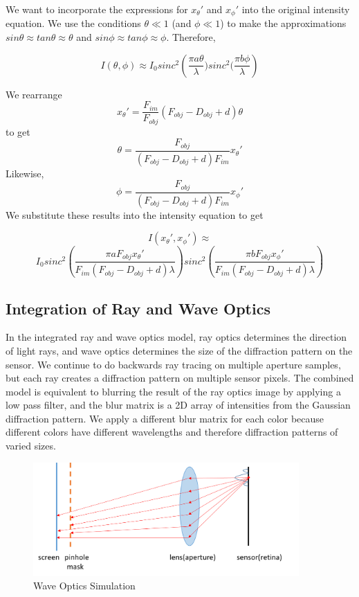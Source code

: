 We want to incorporate the expressions for $x_{\theta}'$ and $x_{\phi}'$ into the original intensity equation. We use the conditions $\theta \ll 1$ (and $\phi \ll 1$) to make the approximations $sin\theta \approx tan\theta \approx \theta$ and $sin\phi \approx tan\phi \approx \phi$. Therefore, 

$$I(\theta, \phi) \approx I_0 sinc^2\left(\frac{\pi a \theta}{\lambda}) sinc^2(\frac{\pi b \phi}{\lambda}\right)$$

We rearrange $$x_{\theta}' = \frac{F_{im}}{F_{obj}} (F_{obj} - D_{obj} + d) \theta $$ to get $$\theta =  \frac{F_{obj}} {(F_{obj} - D_{obj} + d)F_{im}} x_{\theta}'$$ Likewise,  $$\phi =  \frac{F_{obj}} {(F_{obj} - D_{obj} + d)F_{im}} x_{\phi}'$$ We substitute these results into the intensity equation to get

$$I(x_{\theta}', x_{\phi}') \approx $$ $$I_0 sinc^2 \left(\frac{\pi a F_{obj} x_{\theta}'}{F_{im}(F_{obj} - D_{obj} + d)\lambda}\right) sinc^2 \left(\frac{\pi b F_{obj} x_{\phi}'}{F_{im}(F_{obj} - D_{obj} + d)\lambda}\right)$$

\subsection{Integration of Ray and Wave Optics}

In the integrated ray and wave optics model, ray optics determines the direction of light rays, and wave optics determines the size of the diffraction pattern on the sensor. We continue to do backwards ray tracing on multiple aperture samples, but each ray creates a diffraction pattern on multiple sensor pixels. The combined model is equivalent to blurring the result of the ray optics image by applying a low pass filter, and the blur matrix is a 2D array of intensities from the Gaussian diffraction pattern. We apply a different blur matrix for each color because different colors have different wavelengths and therefore diffraction patterns of varied sizes.

\begin{figure}[ht]
  \centering
  \includegraphics[width=4in]{chapters/chapter8/images/Diffract_Simulation.png}
  \caption{Wave Optics Simulation}
  \label{fig:ferrari}
\end{figure}


